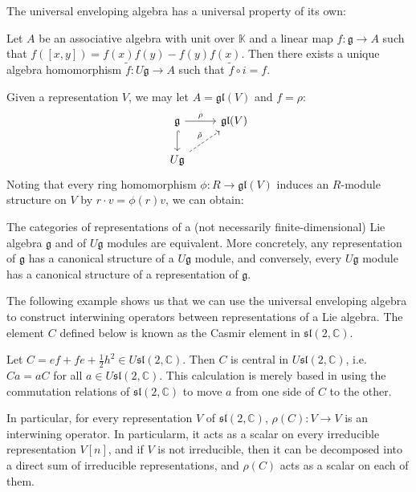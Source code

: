 \documentclass{report}
\begin{document}
The universal enveloping algebra has a universal property of its own:
\begin{theorem}
    Let $A$ be an associative algebra with unit over $\mathbb K$ and a linear map $f: \mathfrak g \to A$ such that $f([x,y]) = f(x)f(y) - f(y)f(x)$.
    Then there exists a unique algebra homomorphism $\tilde f: U \mathfrak g \to A$ such that $\tilde f \circ i = f$.
\end{theorem}
Given a representation $V$, we may let $A = \mathfrak{gl}(V)$ and $f = \rho$:
\[
\begin{tikzcd}
    \mathfrak g \arrow[r, "\rho"] \arrow[d, hook] & \mathfrak{gl}(V)\\
    U \mathfrak g \arrow[ur, dashed, "\tilde \rho"]
\end{tikzcd}
\]
Noting that every ring homomorphism $\phi: R \to \mathfrak{gl}(V)$ induces an $R$-module structure on $V$ by $r \cdot v = \phi(r) v$, we can obtain:
\begin{corollary}
    The categories of representations of a (not necessarily finite-dimensional) Lie algebra $\mathfrak g$ and of $U \mathfrak g$ modules are equivalent. 
    More concretely, any representation of $\mathfrak g$ has a canonical structure of a $U \mathfrak g$ module, and conversely, every $U \mathfrak g$ module has a canonical structure of a representation of $\mathfrak g$.
\end{corollary}

The following example shows us that we can use the universal enveloping algebra to construct interwining operators between representations of a Lie algebra.
The element $C$ defined below is known as the Casmir element in $\mathfrak{sl}(2, \mathbb C)$.
\begin{example}
    Let $C = e f + f e + \frac{1}{2}h^2 \in U \mathfrak{sl}(2, \mathbb C)$.
    Then $C$ is central in $U \mathfrak{sl}(2, \mathbb C)$, i.e.\ $C a = a C $ for all $a \in U \mathfrak{sl}(2, \mathbb C)$.
    This calculation is merely based in using the commutation relations of $\mathfrak{sl}(2, \mathbb C)$ to move $a$ from one side of $C$ to the other.

    In particular, for every representation $V$ of $\mathfrak{sl}(2, \mathbb C)$, $\rho(C): V \to V$ is an interwining operator.
    In particularm, it acts as a scalar on every irreducible representation $V[n]$, and if $V$ is not irreducible, then it can be decomposed into a direct sum of irreducible representations, and $\rho(C)$ acts as a scalar on each of them.
\end{example}
\end{document}
